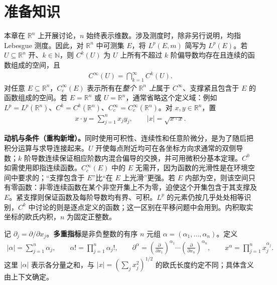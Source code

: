 \documentclass[../../main.tex]{subfiles}
\begin{document}
\section{准备知识}\label{section:ch08-preliminaries}
\begin{definition}[本章的函数空间与欧氏记号]\label{definition:ch08-function-spaces}
本章在 $\mathbb R^n$ 上开展讨论，$n$ 始终表示维数。涉及测度时，除非另行说明，均指 Lebesgue 测度。因此，对 $\mathbb R^n$ 中可测集 $E$，将 $L^p(E,m)$ 简写为 $L^p(E)$。若 $U\subseteq\mathbb R^n$ 开、$k\in\mathbb N$，则 $C^k(U)$ 为 $U$ 上所有不超过 $k$ 阶偏导数均存在且连续的函数组成的空间，且
\begin{align*}
C^\infty(U)=\bigcap_{k=1}^{\infty}C^k(U).
\end{align*}
对任意 $E\subseteq\mathbb R^n$，$C_c^\infty(E)$ 表示所有在\emph{整个 $\mathbb R^n$ 上}属于 $C^\infty$、支撑紧且包含于 $E$ 的函数组成的空间。若 $E=\mathbb R^n$ 或 $U=\mathbb R^n$，通常省略这个定义域：例如 $L^p=L^p(\mathbb R^n)$、$C^k=C^k(\mathbb R^n)$、$C_c^\infty=C_c^\infty(\mathbb R^n)$。对 $x,y\in\mathbb R^n$，置
\begin{align*}
x\cdot y=\sum_{j=1}^n x_jy_j,\qquad |x|=\sqrt{x\cdot x}.
\end{align*}
\end{definition}
\begin{remark}
\textbf{动机与条件（重构新增）。}同时使用可积性、连续性和任意阶微分，是为了随后把积分运算与求导连接起来。$U$ 开使每点附近均可在各坐标方向求通常的双侧导数；$k$ 阶导数连续保证相应阶数内混合偏导的交换，并可用微积分基本定理。$C^0$ 如需使用即指连续函数。$C_c^\infty(E)$ 中的 $E$ 无需开，因为函数的光滑性是在环境空间中要求的；“支撑包含于 $E$”比“在 $E$ 上光滑”更强。若 $E$ 内部为空，则该空间只有零函数：非零连续函数在某个非空开集上不为零，迫使这个开集包含于其支撑及 $E$。紧支撑则保证函数及每阶导数均有界、可积。$L^p$ 的元素仍按几乎处处相等识别，$C^k$ 中讨论的则是逐点定义的函数；这一区别在平移问题中会用到。内积取实坐标的欧氏内积，$n$ 为固定正整数。
\end{remark}
\begin{definition}[多重指标]\label{definition:ch08-multiindex}
记 $\partial_j=\partial/\partial x_j$。\textbf{多重指标}是非负整数的有序 $n$ 元组 $\alpha=(\alpha_1,\ldots,\alpha_n)$。定义
\begin{align*}
|\alpha|=\sum_{j=1}^n\alpha_j,\qquad
\alpha!=\prod_{j=1}^n\alpha_j!,\qquad
\partial^\alpha=\left(\frac{\partial}{\partial x_1}\right)^{\alpha_1}\cdots
\left(\frac{\partial}{\partial x_n}\right)^{\alpha_n},\qquad
x^\alpha=\prod_{j=1}^n x_j^{\alpha_j}.
\end{align*}
这里 $|\alpha|$ 表示各分量之和，与 $|x|=(\sum_jx_j^2)^{1/2}$ 的欧氏长度约定不同；具体含义由上下文确定。
\end{definition}
\end{document}
